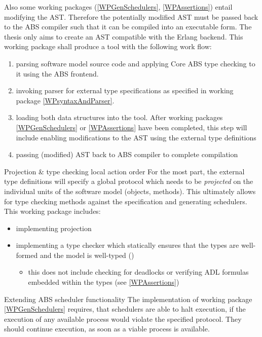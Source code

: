 \documentclass[paper=a4,nochapname,accentcolor=tud9c]{tudexercise}
\makeatletter
\newcommand\textcitep[1]{\mkbibparens{\textcite{#1}}}
\def\namedlabel#1#2{\begingroup
    #1%
    \def\@currentlabel{\thedescriptcount}%
    \phantomsection\label{#2}\endgroup
}
\newcounter{descriptcount}
\renewcommand*\thedescriptcount{[\Alph{descriptcount}]}}
\renewcommand*\thedescriptcount{\roman{descriptcount}}}
\makeatother
\begin{document}
\begin{enumdescript}
    Also some working packages (\ref{WPGenSchedulers}, \ref{WPAssertions}) entail modifying the AST.
    Therefore the potentially modified AST must be passed back to the ABS
    compiler such that it can be compiled into an executable
    form. The thesis only aims to create an AST compatible with the Erlang backend.
    This working package shall produce a tool with the following work flow:
    \begin{enumerate}[label=\arabic*)]
      \item parsing software model source code and applying Core ABS type
        checking to it using the ABS frontend.
      \item invoking parser for external type specifications as specified in working
        package \ref{WPsyntaxAndParser}.
      \item loading both data structures into the tool. After working packages
        \ref{WPGenSchedulers} or \ref{WPAssertions} have been completed, this step will include enabling modifications to the AST using the external type definitions
      \item passing (modified) AST back to ABS compiler to complete compilation
    \end{enumerate}
  \item[\namedlabel{Projection \& type checking local action order}{WPProjectionAndTC}]%
    For the most part, the external type definitions will specify a global
    protocol which needs to be \emph{projected} on the individual units of the
    software model (objects, methods).
    This ultimately allows for type checking methods against the specification
    and generating schedulers.
    This working package includes:
    \begin{itemize}
      \item implementing projection
      \item implementing a type checker which statically ensures that the
        types are well-formed and the model is well-typed \textcitep{kamburjan2018stateful}
        \begin{itemize}
          \item this does not include checking for deadlocks or verifying ADL
            formulas embedded within the types (see \ref{WPAssertions})
        \end{itemize}
    \end{itemize}
  \item[\namedlabel{Extending ABS scheduler functionality}{WPExtendScheduler}]%
    The implementation of working package \ref{WPGenSchedulers} requires, that schedulers are able to
    halt execution, if the execution of any available process would violate the
    specified protocol. They should continue execution, as soon as a viable
    process is available.


\end{enumdescript}
\end{document}

